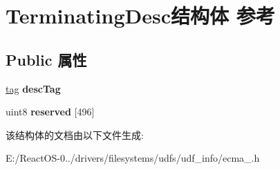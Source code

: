 \hypertarget{struct_terminating_desc}{}\section{Terminating\+Desc结构体 参考}
\label{struct_terminating_desc}
\subsection*{Public 属性}
\begin{DoxyCompactItemize}
\item 
\mbox{\label{struct_terminating_desc_a0bb47838799f8354ff0e08fc0dee1f92}} 
\hyperlink{structtag}{tag} {\bfseries desc\+Tag}
\item 
\mbox{\label{struct_terminating_desc_a60def84f9987f1ebccf4645dc1f1eb7d}} 
uint8 {\bfseries reserved} \mbox{[}496\mbox{]}
\end{DoxyCompactItemize}


该结构体的文档由以下文件生成\+:\begin{DoxyCompactItemize}
\item 
E\+:/\+React\+O\+S-\/0../drivers/filesystems/udfs/udf\+\_\+info/ecma\+\_.\+h\end{DoxyCompactItemize}
